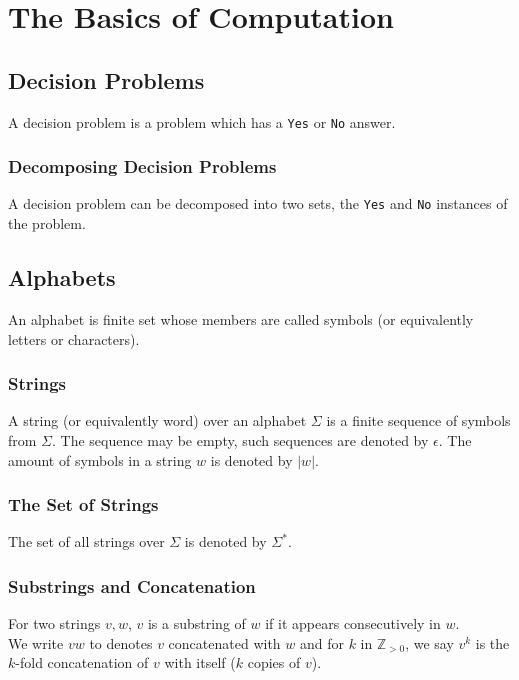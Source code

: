 \section{The Basics of Computation}

\subsection{Decision Problems}

A decision problem is a problem which has a \texttt{Yes} or 
\texttt{No} answer.

\subsubsection{Decomposing Decision Problems}

A decision problem can be decomposed into two sets, the
\texttt{Yes} and \texttt{No} instances of the problem.

\subsection{Alphabets}

An alphabet is finite set whose members are called symbols (or
equivalently letters or characters).

\subsubsection{Strings}

A string (or equivalently word) over an alphabet $\Sigma$ is
a finite sequence of symbols from $\Sigma$. The sequence may be
empty, such sequences are denoted by $\epsilon$. The amount of 
symbols in a string $w$ is denoted by $|w|$.

\subsubsection{The Set of Strings}

The set of all strings over $\Sigma$ is denoted by $\Sigma^*$.

\subsubsection{Substrings and Concatenation}

For two strings $v, w$, $v$ is a substring of $w$ if it appears
consecutively in $w$.
\\[\baselineskip]
We write $vw$ to denotes $v$ concatenated with $w$ and for
$k$ in $\mathbb{Z}_{>0}$, we say $v^k$ is the $k$-fold
concatenation of $v$ with itself ($k$ copies of $v$).

